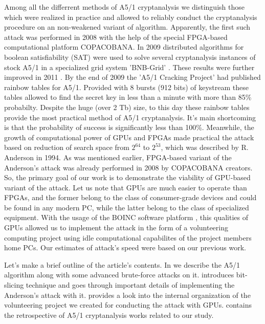\documentclass[runningheads,a4paper]{llncs}[2015/06/24]
\begin{document}
Among all the differrent methods of A5/1 cryptanalysis we distinguish those
which were realized in practice and allowed to reliably conduct the
cryptanalysis procedure on an non-weakened variant of algorithm. Apparently,
the first such attack was performed in 2008 with the help of the special
FPGA-based computational platform COPACOBANA\cite{COPAC_1}. In 2009 distributed
algorithms for boolean satisfiability (SAT) were used to solve several
cryptanalysis instances of stock A5/1 in a specialized grid system 'BNB-Grid'
\cite{TRUDY_ISA}. These results were further improved in 2011 \cite{SZBP}. By
the end of 2009 the 'A5/1 Cracking Project' had published rainbow tables
\cite{RAINBOW} for A5/1. Provided with 8 bursts (912 bits) of keystream these
tables allowed to find the secret key in less than a minute with more than 85\%
probabilty. Despite the huge (over 2 Tb) size, to this day these rainbow tables
provide the most practical method of A5/1 cryptanalysis.  It's main shortcoming
is that the probability of success is significantly less than 100\%. Meanwhile,
the growth of computational power of GPUs and FPGAs made practical the attack
based on reduction of search space from $2^64$ to $2^53$, which was described
by R.  Anderson in 1994. As was mentioned earlier, FPGA-based variant of the
Anderson's attack was already performed in 2008 by COPACOBANA creators. So, the
primary goal of our work is to demonstrate the viability of GPU-based variant
of the attack. Let us note that GPUs are much easier to operate than FPGAs, and
the former belong to the class of consumer-grade devices and could be found in
any modern PC, while the latter belong to the class of specialized equipment.
With the usage of the BOINC software platform \cite{BOINC_C}, this qualities of
GPUs allowed us to implement the attack in the form of a volunteering computing
project using idle computational capabilites of the project members home PCs.
Our estimates of attack's speed were based on our previous
work\cite{BUL_SEM_2016}.

Let's make a brief outline of the article's contents. In  we
describe the A5/1 algorithm along with some advanced brute-force attacks on it.
 introduces bit-slicing technique and goes through important
details of implementing the Anderson's attack with it. 
provides a look into the internal organization of the volunteering project we
created for conducting the attack with GPUs.  contains the
retrospective of A5/1 cryptanalysis works related to our study.
\end{document}
